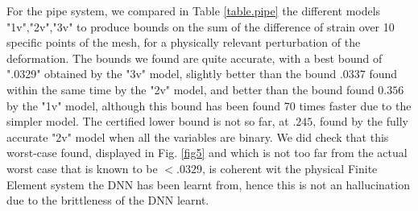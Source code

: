 	For the pipe system, we compared in Table \ref{table.pipe} the different models "1v","2v","3v" to produce bounds on the sum of the difference of strain over 10 specific points of the mesh, for a physically relevant perturbation of the deformation. The bounds we found are quite accurate, with a best bound of ".0329" obtained by the "3v" model, slightly better than the bound $.0337$ found within the same time by the "2v" model, and better than the bound found $0.356$ by the "1v" model, although this bound has been found 70 times faster due to the simpler model. The certified lower bound is not so far, at $.245$, found by the fully accurate "2v" model when all the variables are binary. We did check that this worst-case found, displayed in Fig. \ref{fig5} and which is not too far from the actual worst case that is known to be $<.0329$, is coherent wit the physical Finite Element system the DNN has been learnt from, hence this is not an hallucination due to the brittleness of the DNN learnt.


	
	\vspace*{1ex}
	

	
